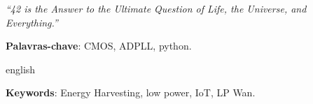 \begin{epigrafe}
    \vspace*{\fill}
	\begin{flushright}
		\textit{“42 is the Answer to the Ultimate Question of Life, the Universe, and Everything.”  \\
}
	\end{flushright}
\end{epigrafe}


\setlength{\absparsep}{18pt} %
\begin{resumo}
  
 \textbf{Palavras-chave}: CMOS, ADPLL, python.
\end{resumo}

\begin{resumo}[Abstract]
 \begin{otherlanguage*}{english}

   \vspace{\onelineskip}
 
   \noindent 
   \textbf{Keywords}: Energy Harvesting, low power, IoT, LP Wan.
 \end{otherlanguage*}
\end{resumo}


\listoffigures*
\cleardoublepage

\listofquadros*
\cleardoublepage

\listoftables*
\cleardoublepage

